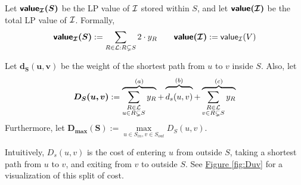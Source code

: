	\begin{definition}\label{def:value}
		Let $\bm{\textbf{\textsf{\textup{value}}}_{\mathcal{I}}(S)}$ be the LP value of $\mathcal{I}$ stored within $S$, and let $\bm{\textbf{\textsf{\textup{value}}}(\mathcal{I})}$ be the total LP value of $\mathcal{I}$. Formally,
		\[
			\bm{\textbf{\textsf{\textup{value}}}_{\mathcal{I}}(S)}:=\sum\limits_{R\in \mathcal{L}:R\subsetneq S}2\cdot y_R\qquad \bm{\textbf{\textsf{\textup{value}}}(\mathcal{I})}:=\textsf{\textup{value}}_{\mathcal{I}}(V)
		\]
	\end{definition}

	\begin{definition}
	\label{def:D}
		Let $\bm{d_S(u,v)}$ be the weight of the shortest path from $u$ to $v$ inside $S$. Also, let
		\begin{equation*}
			\bm{D_S(u,v)}:=\overbrace{\sum_{\substack{R\in \lam \\ u\in R\subsetneq S}}y_R}^{(a)} + \overbrace{\rule{0pt}{4mm}d_s(u,v)}^{(b)} + \overbrace{\sum_{\substack{R\in \lam \\ v\in R\subsetneq S}}y_R}^{(c)}\label{def:1}
		\end{equation*}
		Furthermore, let $\bm{D_{\max}(S)} := \max\limits_{u \in S_{in}, v \in S_{out}}D_S(u,v)$.

		Intuitively, $D_s(u,v)$ is the cost of entering $u$ from outside $S$, taking a shortest path from $u$ to $v$, and exiting from $v$ to outside $S$. See \hyperref[fig:Duv]{Figure \ref{fig:Duv}} for a visualization of this split of cost.\\
	\end{definition}

